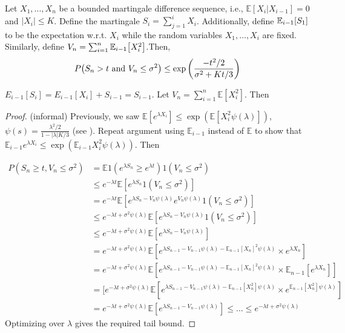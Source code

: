 \documentclass[11pt]{article}
\begin{document}
\begin{theorem}
Let $X_1, ..., X_n$ be a bounded martingale difference sequence, i.e.,  $\mathbb{E}[X_i|X_{i-1}]=0$ and  $|X_i|\le K$. Define the martingale $S_i = \sum_{j=1}^i X_i$. Additionally, define $\operatorname{\mathbb{E}}_{i-1}[S_1]$ to be the expectation w.r.t. $X_i$ while the random variables $X_1, \ldots, X_i$ are fixed. Similarly, define $V_n = \sum_{i=1}^n \En_{i-1} \brk*{X_i^2} $.Then, 
$$ P\prn*{S_n>t \text{ and } V_n\le \sigma^2} \le \exp\left(\frac{-t^2/2}{\sigma^2+Kt/3}\right) $$
\end{theorem}

$E_{i-1}[S_i] = E_{i-1}[X_i]+S_{i-1}=S_{i-1}$. Let $V_n = \sum_{i=1}^n \mathbb{E}[X_i^2]$. Then 


\begin{proof}(informal)
Previously, we saw $\mathbb{E}[e^{\lambda X_i}]\le \exp(\mathbb{E}[X_i^2\psi(\lambda)])$, $\psi(s) = \frac{\lambda^2/2}{1-|\lambda|K/3}$ (see ). Repeat argument using $\mathbb{E}_{i-1}$ instead of $\mathbb{E}$ to show that $\mathbb{E}_{i-1}e^{\lambda X_i}\le \exp(\mathbb{E}_{i-1}X_i^2\psi(\lambda))$. Then 

\begin{align*}
    P(S_n\ge t, V_n\le \sigma^2) &= \mathbb{E}1(e^{\lambda S_n}\ge e^{\lambda t})1(V_n\le \sigma^2) \\& \le e^{-\lambda t}\mathbb{E}[e^{\lambda S_n}1(V_n\le \sigma^2)] \\&= e^{-\lambda t}\mathbb{E}[e^{\lambda S_n-V_n\psi(\lambda)}e^{V_n\psi(\lambda)}1(V_n\le \sigma^2)] \\ &\le e^{-\lambda t+\sigma^2 \psi(\lambda)}\mathbb{E}[e^{\lambda S_n-V_n\psi(\lambda)}1(V_n\le \sigma^2)]
    \\&\le e^{-\lambda t+\sigma^2 \psi(\lambda)}\mathbb{E}[e^{\lambda S_n -V_n\psi(\lambda)}] 
    \\&= e^{-\lambda t +\sigma^2\psi(\lambda)}\mathbb{E}[e^{\lambda S_{n-1}-V_{n-1}\psi(\lambda)-\mathbb{E}_{n-1}[X_n]^2\psi(\lambda)}\times e^{\lambda X_n}]\\&= e^{-\lambda t +\sigma^2\psi(\lambda)}\mathbb{E}[e^{\lambda S_{n-1}-V_{n-1}\psi(\lambda)-\mathbb{E}_{n-1}[X_n]^2\psi(\lambda)}\times \mathbb{E}_{n-1}[e^{\lambda X_n}]]  \\& =
    [e^{-\lambda t +\sigma^2 \psi(\lambda)}\mathbb{E}[e^{\lambda S_{n-1}-V_{n-1}\psi(\lambda)-\mathbb{E}_{n-1}[X_n^2]\psi(\lambda)}\times e^{\mathbb{E}_{n-1}[X_n^2]\psi(\lambda)}]
    \\& = e^{-\lambda t+\sigma^2 \psi(\lambda)}\mathbb{E}[e^{\lambda S_{n-1}-V_{n-1}\psi(\lambda)}]\le ...\le e^{-\lambda t +\sigma^2\psi(\lambda)} 
\end{align*}
Optimizing over $\lambda$ gives the required tail bound.
\end{proof}

\nocite{*}
{\small

}
\end{document}
